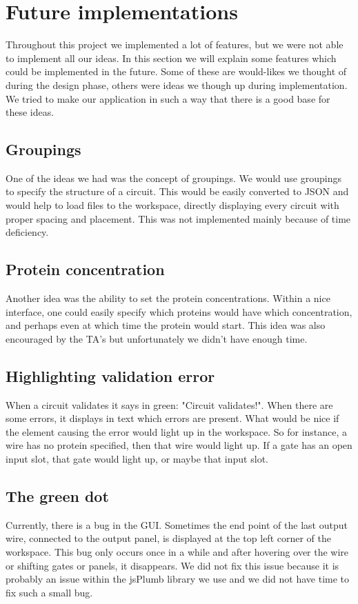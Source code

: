\section{Future implementations}
Throughout this project we implemented a lot of features, but we were not able to implement all our ideas. In this section we will explain some features which could be implemented in the future. Some of these are would-likes we thought of during the design phase, others were ideas we though up during implementation. We tried to make our application in such a way that there is a good base for these ideas.

\subsection{Groupings}
One of the ideas we had was the concept of groupings. We would use groupings to specify the structure of a circuit. This would be easily converted to JSON and would help to load files to the workspace, directly displaying every circuit with proper spacing and placement. This was not implemented mainly because of time deficiency.

\subsection{Protein concentration}
Another idea was the ability to set the protein concentrations. Within a nice interface, one could easily specify which proteins would have which concentration, and perhaps even at which time the protein would start. This idea was also encouraged by the TA's but unfortunately we didn't have enough time.

\subsection{Highlighting validation error}
When a circuit validates it says in green: "Circuit validates!". When there are some errors, it displays in text which errors are present. What would be nice if the element causing the error would light up in the workspace. So for instance, a wire has no protein specified, then that wire would light up.
If a gate has an open input slot, that gate would light up, or maybe that input slot.

\subsection{The green dot}
Currently, there is a bug in the GUI. Sometimes the end point of the last output wire, connected to the output panel, is displayed at the top left corner of the workspace. This bug only occurs once in a while and after hovering over the wire or shifting gates or panels, it disappears. We did not fix this issue because it is probably an issue within the jsPlumb library we use and we did not have time to fix such a small bug.


